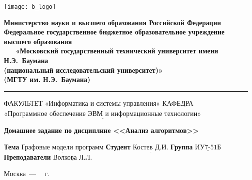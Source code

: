 \documentclass[12pt]{report}
\begin{document}
\thispagestyle{empty}
\begin{titlepage}
	\noindent \begin{minipage}{0.15\textwidth}
	\texttt{[image: b\_logo]}
	\end{minipage}
	\noindent\begin{minipage}{0.9\textwidth}\centering
		\textbf{Министерство науки и высшего образования Российской Федерации}\\
		\textbf{Федеральное государственное бюджетное образовательное учреждение высшего образования}\\
		\textbf{~~~«Московский государственный технический университет имени Н.Э.~Баумана}\\
		\textbf{(национальный исследовательский университет)»}\\
		\textbf{(МГТУ им. Н.Э.~Баумана)}
	\end{minipage}
	
	\noindent\rule{18cm}{3pt}
	\newline\newline
	\noindent ФАКУЛЬТЕТ $\underline{\text{«Информатика и системы управления»}}$ \newline\newline
	\noindent КАФЕДРА $\underline{\text{«Программное обеспечение ЭВМ и информационные технологии»}}$\newline\newline\newline\newline\newline
	
	
	\begin{center}
		\noindent\begin{minipage}{1.3\textwidth}\centering
			\Large\textbf{  Домашнее задание по }\newline
			\textbf{ дисциплине <<Анализ алгоритмов>>}\newline\newline
		\end{minipage}
	\end{center}
	
	\noindent\textbf{Тема} $\underline{\text{Графовые модели программ}}$\newline\newline
	\noindent\textbf{Студент} $\underline{\text{Костев Д.И.}}$\newline\newline
	\noindent\textbf{Группа} $\underline{\text{ИУ7-51Б}}$\newline\newline
	\noindent\textbf{Преподаватели} $\underline{\text{Волкова Л.Л.}}$\newline\newline\newline
	
	\begin{center}
		\vfill
		Москва~---~\the\year
		~г.
	\end{center}
\end{titlepage}
\end{document}
